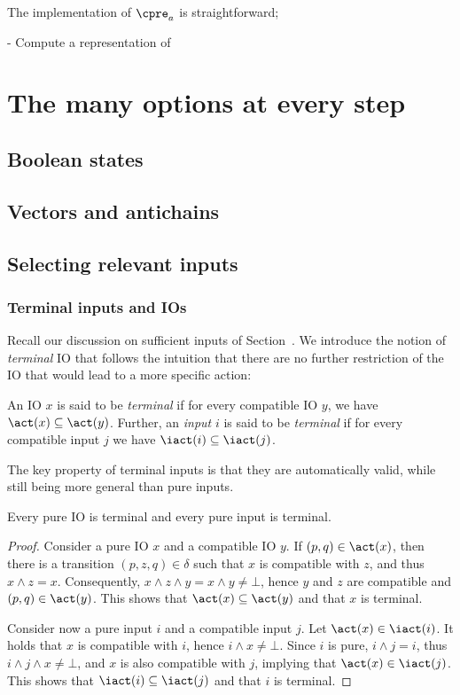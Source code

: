 \documentclass[sigconf,screen]{acmart}
\begin{document}
The implementation of \(\cpre_a\) is straightforward; 

- Compute a representation of 

\section{The many options at every step}


\subsection{Boolean states}

\subsection{Vectors and antichains}

\subsection{Selecting relevant inputs}

\subsubsection{Terminal inputs and IOs}

Recall our discussion on sufficient inputs of Section~\label{sec:rel}.  We
introduce the notion of \emph{terminal} IO that follows the intuition that there
are no further restriction of the IO that would lead to a more specific action:
\begin{definition}
  An IO \(x\) is said to be \emph{terminal} if for every compatible IO \(y\), we
  have \(\act(x) \subseteq \act(y)\).  Further, an \emph{input} \(i\) is said to be
  \emph{terminal} if for every compatible input \(j\) we have
  \(\iact(i) \subseteq \iact(j)\).
\end{definition}

The key property of terminal inputs is that they are automatically valid, while
still being more general than pure inputs.
\begin{proposition}
  Every pure IO is terminal and every pure input is terminal.
\end{proposition}
\begin{proof}
  Consider a pure IO \(x\) and a compatible IO \(y\).  If \((p, q) \in \act(x)\), then
  there is a transition \((p, z, q) \in \delta\) such that \(x\) is compatible with \(z\),
  and thus \(x \land z = x\).  Consequently, \(x \land z \land y = x \land y \neq \bot\),
  hence \(y\) and \(z\) are compatible and \((p, q) \in \act(y)\).  This shows that
  \(\act(x) \subseteq \act(y)\) and that \(x\) is terminal.

  Consider now a pure input \(i\) and a compatible input \(j\).  Let \(\act(x) \in
  \iact(i)\).  It holds that \(x\) is compatible with \(i\), hence \(i \land x \neq \bot\).
  Since \(i\) is pure, \(i \land j = i\), thus \(i \land j \land x \neq \bot\), and \(x\) is
  also compatible with \(j\), implying that \(\act(x) \in \iact(j)\).  This shows that
  \(\iact(i) \subseteq \iact(j)\) and that \(i\) is terminal.
\end{proof}
\end{document}
